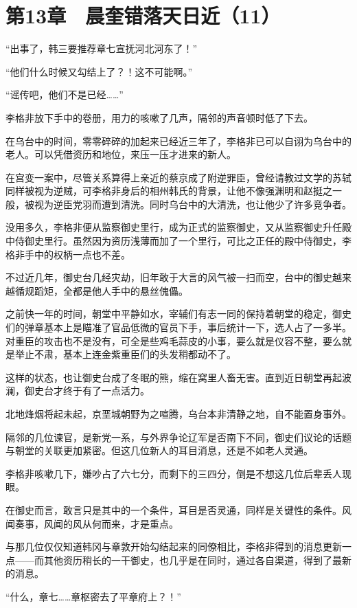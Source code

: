 \section{第13章　晨奎错落天日近（11）}

“出事了，韩三要推荐章七宣抚河北河东了！”

“他们什么时候又勾结上了？！这不可能啊。”

“谣传吧，他们不是已经……”

李格非放下手中的卷册，用力的咳嗽了几声，隔邻的声音顿时低了下去。

在乌台中的时间，零零碎碎的加起来已经近三年了，李格非已可以自诩为乌台中的老人。可以凭借资历和地位，来压一压才进来的新人。

在宫变一案中，尽管关系算得上亲近的蔡京成了附逆罪臣，曾经请教过文学的苏轼同样被视为逆贼，可李格非身后的相州韩氏的背景，让他不像强渊明和赵挺之一般，被视为逆臣党羽而遭到清洗。同时乌台中的大清洗，也让他少了许多竞争者。

没用多久，李格非便从监察御史里行，成为正式的监察御史，又从监察御史升任殿中侍御史里行。虽然因为资历浅薄而加了一个里行，可比之正任的殿中侍御史，李格非手中的权柄一点也不差。

不过近几年，御史台几经灾劫，旧年敢于大言的风气被一扫而空，台中的御史越来越循规蹈矩，全都是他人手中的悬丝傀儡。

之前快一年的时间，朝堂中平静如水，宰辅们有志一同的保持着朝堂的稳定，御史们的弹章基本上是瞄准了官品低微的官员下手，事后统计一下，选人占了一多半。对重臣的攻击也不是没有，可全是些鸡毛蒜皮的小事，要么就是仪容不整，要么就是举止不肃，基本上连金紫重臣们的头发稍都动不了。

这样的状态，也让御史台成了冬眠的熊，缩在窝里人畜无害。直到近日朝堂再起波澜，御史台才终于有了一点活力。

北地烽烟将起未起，京垩城朝野为之喧腾，乌台本非清静之地，自不能置身事外。

隔邻的几位谏官，是新党一系，与外界争论辽军是否南下不同，御史们议论的话题与朝堂的关联更加紧密。但这几位新人的耳目消息，还是不如老人灵通。

李格非咳嗽几下，嫌吵占了六七分，而剩下的三四分，倒是不想这几位后辈丢人现眼。

在御史而言，敢言只是其中的一个条件，耳目是否灵通，同样是关键性的条件。风闻奏事，风闻的风从何而来，才是重点。

与那几位仅仅知道韩冈与章敦开始勾结起来的同僚相比，李格非得到的消息更新一点——而其他资历稍长的一干御史，也几乎是在同时，通过各自渠道，得到了最新的消息。

“什么，章七……章枢密去了平章府上？！”

